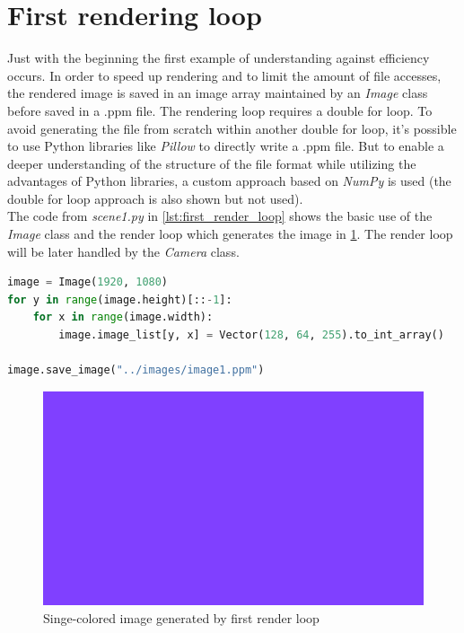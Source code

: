 \documentclass[]{article}
\begin{document}
	\section{First rendering loop}
	Just with the beginning the first example of understanding against efficiency occurs. In order to speed up rendering and to limit the amount of file accesses, the rendered image is saved in an image array maintained by an \emph{Image} class before saved in a .ppm file. The rendering loop requires a double for loop. To avoid generating the file from scratch within another double for loop, it’s possible to use Python libraries like \emph{Pillow} to directly write a .ppm file. But to enable a deeper understanding of the structure of the file format while utilizing the advantages of Python libraries, a custom approach based on \emph{NumPy} is used (the double for loop approach is also shown but not used).
	\\
	The code from \emph{scene1.py} in \cref{lst:first_render_loop} shows the basic use of the \emph{Image} class and the render loop which generates the image in \cref{fig:image1}. The render loop will be later handled by the \emph{Camera} class.
	
	\begin{lstlisting}[caption={Example for a basic render loop}, language=Python, label=lst:first_render_loop]
image = Image(1920, 1080)
for y in range(image.height)[::-1]:
	for x in range(image.width):
		image.image_list[y, x] = Vector(128, 64, 255).to_int_array()

image.save_image("../images/image1.ppm")
	\end{lstlisting}

	\begin{figure}[h]
		\centering
		\includegraphics[width=0.9\linewidth]{image1}
		\caption{Singe-colored image generated by first render loop}
		\label{fig:image1}
	\end{figure}
\end{document}

